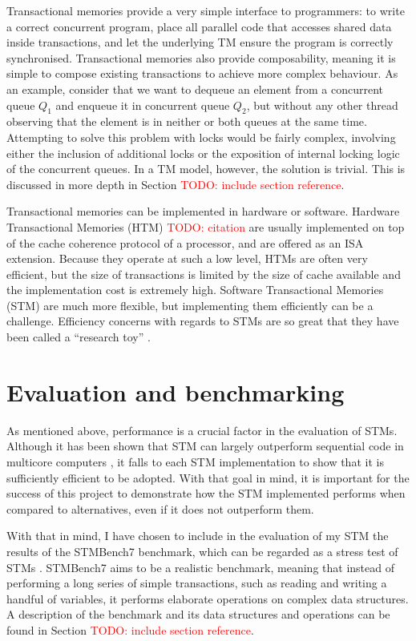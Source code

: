 \documentclass[12pt,a4paper,twoside,openright]{report}
\newcommand{\todo}[1]{\textcolor{red}{TODO: #1}}
\begin{document}
Transactional memories provide a very simple interface to programmers:
to write a correct concurrent program, place all parallel code that
accesses shared data inside transactions, and let the underlying TM
ensure the program is correctly synchronised. Transactional memories
also provide composability, meaning it is simple to compose existing
transactions to achieve more complex behaviour. As an example,
consider that we want to dequeue an element from a concurrent queue
$Q_1$ and enqueue it in concurrent queue $Q_2$, but without any other
thread observing that the element is in neither or both queues at the
same time. Attempting to solve this problem with locks would be fairly
complex, involving either the inclusion of additional locks or the
exposition of internal locking logic of the concurrent queues. In a TM
model, however, the solution is trivial. This is discussed in more
depth in Section \todo{include section reference}.

Transactional memories can be implemented in hardware or
software. Hardware Transactional Memories (HTM) \todo{citation} are
usually implemented on top of the cache coherence protocol of a
processor, and are offered as an ISA extension. Because they operate
at such a low level, HTMs are often very efficient, but the size of
transactions is limited by the size of cache available and the
implementation cost is extremely high. Software Transactional Memories
(STM) \cite{STM} are much more flexible, but implementing them
efficiently can be a challenge. Efficiency concerns with regards to
STMs are so great that they have been called a ``research toy''
\cite{Toy}.

\section{Evaluation and benchmarking}
\label{sec:eval-benchm}

As mentioned above, performance is a crucial factor in the evaluation
of STMs. Although it has been shown that STM can largely outperform
sequential code in multicore computers \cite{MoreThanToy}, it falls to
each STM implementation to show that it is sufficiently efficient to
be adopted. With that goal in mind, it is important for the success of
this project to demonstrate how the STM implemented performs when
compared to alternatives, even if it does not outperform them.

With that in mind, I have chosen to include in the evaluation of my
STM the results of the STMBench7 benchmark, which can be regarded as a
stress test of STMs \cite{STMBench7}. STMBench7 aims to be a realistic
benchmark, meaning that instead of performing a long series of simple
transactions, such as reading and writing a handful of variables, it
performs elaborate operations on complex data structures. A
description of the benchmark and its data structures and operations
can be found in Section \todo{include section reference}.
\end{document}
